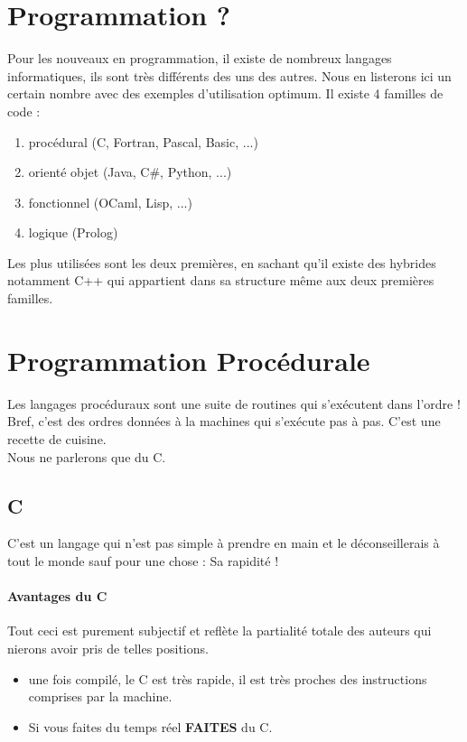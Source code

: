 \documentclass[a4paper,10pt]{book_ad}
\begin{document}
\section{Programmation ?}

Pour les nouveaux en programmation, il existe de nombreux langages informatiques, ils sont très 
différents des uns des autres. Nous en listerons ici un certain nombre avec des exemples d'utilisation 
optimum. 
Il existe 4 familles de code :

\begin{enumerate}
\item procédural (C, Fortran, Pascal, Basic, ...)
\item orienté objet (Java, C\#, Python, ...)
\item fonctionnel (OCaml, Lisp, ...)
\item logique (Prolog)
\end{enumerate}

Les plus utilisées sont les deux premières, en sachant qu'il existe des hybrides notamment C++ 
qui appartient dans sa structure même aux deux premières familles. 

\section{Programmation Procédurale}

Les langages procéduraux sont une suite de routines qui s'exécutent dans l'ordre ! Bref, c'est des ordres 
données à la machines qui s'exécute pas à pas. C'est une recette de cuisine.\\

Nous ne parlerons que du C. 

\subsection{C}

C'est un langage qui n'est pas simple à prendre en main et le déconseillerais à tout le monde sauf pour 
une chose : Sa rapidité ! 

\paragraph{Avantages du C}

Tout ceci est purement subjectif et reflète la partialité totale des auteurs qui nierons
 avoir pris de telles positions.
\begin{itemize}
\item une fois compilé, le C est très rapide, il est très proches des instructions comprises par la machine. 
\item Si vous faites du temps réel \textbf{FAITES} du C.
\end{itemize}
\end{document}
